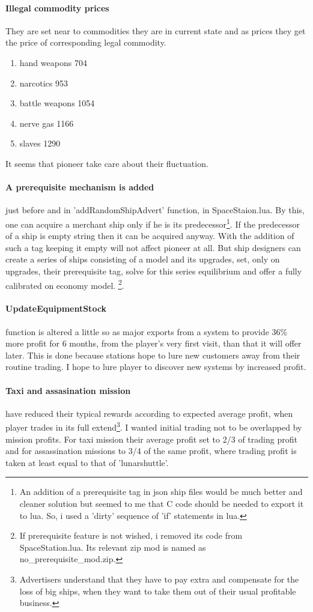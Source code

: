 \documentclass[]{article}
\begin{document}
\paragraph{Illegal commodity prices}
They are set near to commodities they are in current state and as prices they get the price of corresponding legal commodity. 
\begin{enumerate}
	\item hand weapons 704
	\item narcotics 953
	\item battle weapons 1054
	\item nerve gas 1166
	\item slaves 1290
\end{enumerate}
It seems that pioneer take care about their fluctuation.
\paragraph{A prerequisite mechanism is added} just before and in 'addRandomShipAdvert' function, in SpaceStaion.lua. By this, one can acquire a merchant ship only if he is its predecessor\footnote{An addition of a prerequisite tag in json ship files would be much better and cleaner solution but seemed to me that C code should be needed to export it to lua. So, i used a 'dirty' sequence of \textsf{'if'} statements in lua.}. If the predecessor of a ship is empty string then it can be acquired anyway. With the addition of such a tag keeping it empty will not affect pioneer at all. But ship designers can create a series of ships consisting of a model and its upgrades, set, only on upgrades, their prerequisite tag, solve for this series equilibrium and offer a fully calibrated on economy model.
\footnote{If prerequisite feature is not wished, i removed its code from SpaceStation.lua. Its relevant zip mod is named as no\_prerequisite\_mod.zip.}. 
\paragraph{UpdateEquipmentStock} function is altered a little so as major exports from a system to provide 36\% more profit for 6 months, from the player's very first visit, than that it will offer later. This is done because stations hope to lure new customers away from their routine trading. I hope to lure player to discover new systems by increased profit.
\paragraph{Taxi and assasination mission} have reduced their typical rewards according to expected average profit, when player trades in its full extend\footnote{Advertisers understand that they have to pay extra and compensate for the loss of big ships, when they want to take them out of their usual profitable business.}. I wanted initial trading not to be overlapped by mission profits. For taxi mission their average profit set to 2/3 of trading profit and for assassination missions to 3/4 of the same profit, where trading profit is taken at least equal to that of 'lunarshuttle'.
\end{document}
